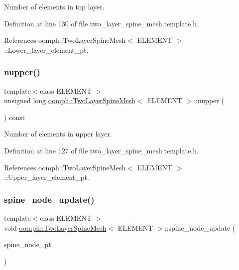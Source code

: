 Number of elements in top layer. 



Definition at line 130 of file two\+\_\+layer\+\_\+spine\+\_\+mesh.\+template.\+h.



References oomph\+::\+Two\+Layer\+Spine\+Mesh$<$ E\+L\+E\+M\+E\+N\+T $>$\+::\+Lower\+\_\+layer\+\_\+element\+\_\+pt.

\mbox{\label{classoomph_1_1TwoLayerSpineMesh_a7d92e162c4fd6e70627982f761d1a66c}} 
\subsubsection{\texorpdfstring{nupper()}{nupper()}}
{\footnotesize\ttfamily template$<$class E\+L\+E\+M\+E\+NT $>$ \\
unsigned long \hyperlink{classoomph_1_1TwoLayerSpineMesh}{oomph\+::\+Two\+Layer\+Spine\+Mesh}$<$ E\+L\+E\+M\+E\+NT $>$\+::nupper (\begin{DoxyParamCaption}{ }\end{DoxyParamCaption}) const\hspace{0.3cm}{\ttfamily [inline]}}



Number of elements in upper layer. 



Definition at line 127 of file two\+\_\+layer\+\_\+spine\+\_\+mesh.\+template.\+h.



References oomph\+::\+Two\+Layer\+Spine\+Mesh$<$ E\+L\+E\+M\+E\+N\+T $>$\+::\+Upper\+\_\+layer\+\_\+element\+\_\+pt.

\mbox{\label{classoomph_1_1TwoLayerSpineMesh_ad9b80ae7e34be72ca03f6d1bc6062de4}} 
\subsubsection{\texorpdfstring{spine\+\_\+node\+\_\+update()}{spine\_node\_update()}}
{\footnotesize\ttfamily template$<$class E\+L\+E\+M\+E\+NT $>$ \\
void \hyperlink{classoomph_1_1TwoLayerSpineMesh}{oomph\+::\+Two\+Layer\+Spine\+Mesh}$<$ E\+L\+E\+M\+E\+NT $>$\+::spine\+\_\+node\+\_\+update (\begin{DoxyParamCaption}\item[{Spine\+Node $\ast$}]{spine\+\_\+node\+\_\+pt }\end{DoxyParamCaption})\hspace{0.3cm}{\ttfamily [inline]}}



